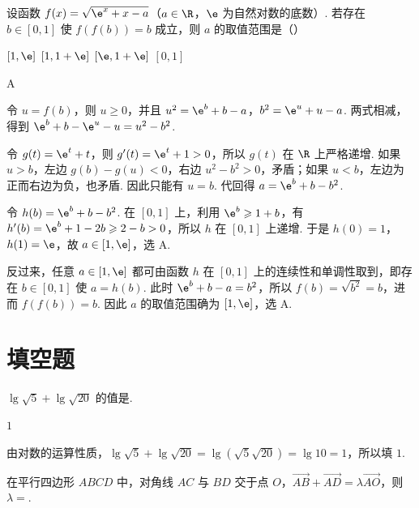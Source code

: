 \begin{problem}
设函数 \(f(x)=\sqrt{\e^x+x-a}\)（\(a\in\R\)，\(\e\) 为自然对数的底数）. 若存在 \(b\in[0,1]\) 使 \(f(f(b))=b\) 成立，则 \(a\) 的取值范围是（\quad）

\choices
    {\([1,\e]\)}
    {\([1,1+\e]\)}
    {\([\e,1+\e]\)}
    {\([0,1]\)}
\end{problem}

\begin{answer}
A
\end{answer}

\begin{solution}
令 \(u=f(b)\)，则 \(u\geqslant0\)，并且
\(u^2=\e^b+b-a\)，\(b^2=\e^u+u-a\). 两式相减，得到
\(\e^b+b-\e^u-u=u^2-b^2\).

令 \(g(t)=\e^t+t\)，则 \(g'(t)=\e^t+1>0\)，所以 \(g(t)\) 在 \(\R\) 上严格递增. 如果 \(u>b\)，左边 \(g(b)-g(u)<0\)，右边 \(u^2-b^2>0\)，矛盾；如果 \(u<b\)，左边为正而右边为负，也矛盾. 因此只能有 \(u=b\). 代回得
\(a=\e^b+b-b^2\).

令 \(h(b)=\e^b+b-b^2\). 在 \([0,1]\) 上，利用 \(\e^b\geqslant1+b\)，有 \(h'(b)=\e^b+1-2b\geqslant2-b>0\)，所以 \(h\) 在 \([0,1]\) 上递增. 于是 \(h(0)=1\)，\(h(1)=\e\)，故 \(a\in[1,\e]\)，选 A.

反过来，任意 \(a\in[1,\e]\) 都可由函数 \(h\) 在 \([0,1]\) 上的连续性和单调性取到，即存在 \(b\in[0,1]\) 使 \(a=h(b)\). 此时 \(\e^b+b-a=b^2\)，所以 \(f(b)=\sqrt{b^2}=b\)，进而 \(f(f(b))=b\). 因此 \(a\) 的取值范围确为 \([1,\e]\)，选 A.
\end{solution}

\section{填空题}

\begin{problem}
\(\lg\sqrt{5}+\lg\sqrt{20}\) 的值是\fillinblank{}.
\end{problem}

\begin{answer}
\(1\)
\end{answer}

\begin{solution}
由对数的运算性质，\(\lg\sqrt{5}+\lg\sqrt{20}=\lg\left(\sqrt{5}\sqrt{20}\right)=\lg 10=1\)，所以填 \(1\).
\end{solution}

\begin{problem}
在平行四边形 \(ABCD\) 中，对角线 \(AC\) 与 \(BD\) 交于点 \(O\)，\(\overrightarrow{AB}+\overrightarrow{AD}=\lambda\overrightarrow{AO}\)，则 \(\lambda=\)\fillinblank{}.

\end{problem}

